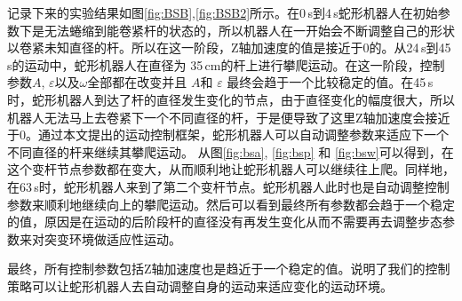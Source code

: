 记录下来的实验结果如图\ref{fig:BSB},\ref{fig:BSB2}所示。在0\,s到4\,s蛇形机器人在初始参数下是无法蜷缩到能卷紧杆的状态的，所以机器人在一开始会不断调整自己的形状以卷紧未知直径的杆。所以在这一阶段，Z轴加速度的值是接近于0的。从24\,s到45\,s的运动中，蛇形机器人在直径为 35\,cm的杆上进行攀爬运动。在这一阶段，控制参数$A$, $\varepsilon$以及$\omega$全部都在改变并且 $A$和 $\varepsilon$ 最终会趋于一个比较稳定的值。在45\,s时，蛇形机器人到达了杆的直径发生变化的节点，由于直径变化的幅度很大，所以机器人无法马上去卷紧下一个不同直径的杆，于是便导致了这里Z轴加速度会接近于0。通过本文提出的运动控制框架，蛇形机器人可以自动调整参数来适应下一个不同直径的杆来继续其攀爬运动。 从图\ref{fig:bsa}, \ref{fig:bsp} 和 \ref{fig:bsw}可以得到，在这个变杆节点参数都在变大，从而顺利地让蛇形机器人可以继续往上爬。同样地，在63\,s时，蛇形机器人来到了第二个变杆节点。蛇形机器人此时也是自动调整控制参数来顺利地继续向上的攀爬运动。然后可以看到最终所有参数都会趋于一个稳定的值，原因是在运动的后阶段杆的直径没有再发生变化从而不需要再去调整步态参数来对突变环境做适应性运动。

最终，所有控制参数包括Z轴加速度也是趋近于一个稳定的值。说明了我们的控制策略可以让蛇形机器人去自动调整自身的运动来适应变化的运动环境。


